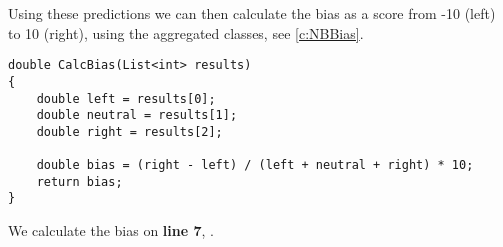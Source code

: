 Using these predictions we can then calculate the bias as a score from -10
(left) to 10 (right), using the aggregated classes, see \autoref{c:NBBias}. 

\begin{minipage}[H]{\linewidth}
\begin{lstlisting}[caption = Determines the users bias based on the predictions,
label = c:NBBias]
double CalcBias(List<int> results)
{
    double left = results[0];
    double neutral = results[1];
    double right = results[2];

    double bias = (right - left) / (left + neutral + right) * 10;
    return bias;
}
\end{lstlisting}
\end{minipage}

We calculate the bias on \textbf{line 7}, .



